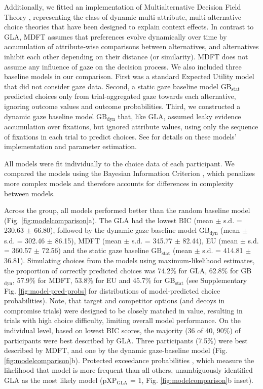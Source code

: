 \documentclass[11pt, a4paper]{article}
\begin{document}
Additionally, we fitted an implementation of Multialternative Decision Field Theory \parencite[MDFT;][]{roe2001MultialternativeDecisionField}, representing the class of dynamic multi-attribute, multi-alternative choice theories that have been designed to explain context effects. In contrast to GLA, MDFT assumes that preferences evolve dynamically over time by accumulation of attribute-wise comparisons between alternatives, and alternatives inhibit each other depending on their distance (or similarity). MDFT does not assume any influence of gaze on the decision process. We also included three baseline models in our comparison. First was a standard Expected Utility model \parencite[EU;][]{vonneumann1947TheoryGamesEconomic} that did not consider gaze data. Second, a static gaze baseline model GB$_{\text{stat}}$ predicted choices only from trial-aggregated gaze towards each alternative, ignoring outcome values and outcome probabilities. Third, we constructed a dynamic gaze baseline model GB$_{\text{dyn}}$ that, like GLA, assumed leaky evidence accumulation over fixations, but ignored attribute values, using only the sequence of fixations in each trial to predict choices. See  for details on these models' implementation and parameter estimation.

All models were fit individually to the choice data of each participant. We compared the models using the Bayesian Information Criterion \parencite[BIC;][]{schwarz1978EstimatingDimensionModel}, which penalizes more complex models and therefore accounts for differences in complexity between models.

Across the group, all models performed better than the random baseline model (Fig. \ref{fig:modelcomparison}a). The GLA had the lowest BIC (mean $\pm$ s.d. = 230.63 $\pm$ 66.80), followed by the dynamic gaze baseline model GB$_{\text{dyn}}$ (mean $\pm$ s.d. = 302.46 $\pm$ 86.15), MDFT (mean $\pm$ s.d. = 345.77 $\pm$ 82.44), EU (mean $\pm$ s.d. = 360.57 $\pm$ 72.56) and the static gaze baseline GB$_{\text{stat}}$ (mean $\pm$ s.d. = 414.81 $\pm$ 36.81). Simulating choices from the models using maximum-likelihood estimates, the proportion of correctly predicted choices was 74.2\% for GLA, 62.8\% for GB$_{\text{dyn}}$, 57.9\% for MDFT, 53.8\% for EU and 45.7\% for GB$_{\text{stat}}$ (see Supplementary Fig. \ref{fig:model-pred-probs} for distributions of model-predicted choice probabilities). Note, that target and competitor options (and decoys in compromise trials) were designed to be closely matched in value, resulting in trials with high choice difficulty, limiting overall model performance. On the individual level, based on lowest BIC scores, the majority (36 of 40, 90\%) of participants were best described by GLA. Three participants (7.5\%) were best described by MDFT, and one by the dynamic gaze-baseline model (Fig. \ref{fig:modelcomparison}b). Protected exceedance probabilities \parencite{rigoux2014BayesianModelSelection}, which measure the likelihood that model is more frequent than all others, unambiguously identified GLA as the most likely model (pXP$_{\text{GLA}}$ = 1, Fig. \ref{fig:modelcomparison}b inset).
\end{document}
